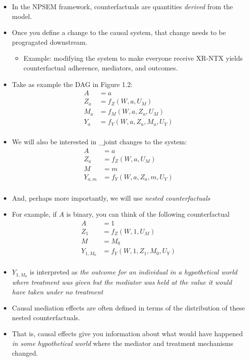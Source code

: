 \documentclass[
  12pt,
]{book}
\providecommand{\tightlist}{%
  \setlength{\itemsep}{0pt}\setlength{\parskip}{0pt}}
\theoremstyle{definition}
\theoremstyle{definition}
\theoremstyle{definition}
\newcommand{\1}{\mathbbm{1}}
\begin{document}
\begin{itemize}
\tightlist
\item
  In the NPSEM framework, counterfactuals are quantities \emph{derived} from the
  model.
\item
  Once you define a change to the causal system, that change needs to be
  progragated downstream.

  \begin{itemize}
  \tightlist
  \item
    Example: modifying the system to make everyone receive XR-NTX yields
    counterfactual adherence, mediators, and outcomes.
  \end{itemize}
\item
  Take as example the DAG in Figure 1.2:
  \begin{align}
    A    &= a\\
    Z_a  &= f_Z(W, a, U_M)\\
    M_a  &= f_M(W, a, Z_a, U_M)\\
    Y_a  &= f_Y(W, a, Z_a, M_a, U_Y)\\
  \end{align}
\item
  We will also be interested in \_joint changes to the system:
  \begin{align}
    A    &= a\\
    Z_a  &= f_Z(W, a, U_M)\\
    M  &= m\\   
    Y_{a,m}  &= f_Y(W, a, Z_a, m, U_Y)\\
  \end{align}
\item
  And, perhaps more importantly, we will use \emph{nested counterfactuals}
\item
  For example, if \(A\) is binary, you can think of the following counterfactual
  \begin{align}
    A    &= 1\\
    Z_1  &= f_Z(W, 1, U_M)\\
    M  &= M_0\\ 
    Y_{1, M_0} &= f_Y(W, 1, Z_1, M_0, U_Y)\\
  \end{align}
\item
  \(Y_{1, M_0}\) is interpreted as \emph{the outcome for an individual in a
  hypothetical world where treatment was given but the mediator was held at the
  value it would have taken under no treatment}
\item
  Causal mediation effects are often defined in terms of the distribution of these
  nested counterfactuals.
\item
  That is, causal effects give you information about what would have happened
  \emph{in some hypothetical world} where the mediator and treatment mechanisms changed.
\end{itemize}
\end{document}
